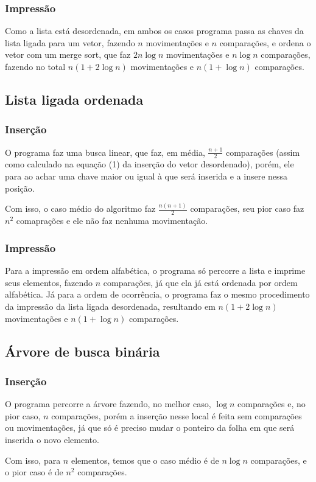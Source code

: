 \documentclass[12pt, a4paper]{article} %
\begin{document}
		\subsubsection{Impressão}
		\par Como a lista está desordenada, em ambos os casos programa passa as chaves da lista ligada para um vetor, fazendo $n$ movimentações e $n$ comparações, e ordena o vetor com um merge sort, que faz $2n\log n$ movimentações e $n\log n$ comparações, fazendo no total $n(1+2\log n)$ movimentações e $n(1+\log n)$ comparações.

	\subsection{Lista ligada ordenada}
		\subsubsection{Inserção}
		\par O programa faz uma busca linear, que faz, em média, $\frac{n+1}{2}$ comparações (assim como calculado na equação (1) da inserção do vetor desordenado), porém, ele para ao achar uma chave maior ou igual à que será inserida e a insere nessa posição.
		\par Com isso, o caso médio do algoritmo faz $\frac{n(n+1)}{2}$ comparações, seu pior caso faz $n^2$ comaprações e ele não faz nenhuma movimentação.
		\subsubsection{Impressão}
		\par Para a impressão em ordem alfabética, o programa só percorre a lista e imprime seus elementos, fazendo $n$ comparações, já que ela já está ordenada por ordem alfabética. Já para a ordem de ocorrência, o programa faz o mesmo procedimento da impressão da lista ligada desordenada, resultando em $n(1+2\log n)$ movimentações e $n(1+\log n)$ comparações.

	\subsection{Árvore de busca binária}
		\subsubsection{Inserção}
		\par O programa percorre a árvore fazendo, no melhor caso, $\log n$ comparações e, no pior caso, $n$ comparações, porém a inserção nesse local é feita sem comparações ou movimentações, já que só é preciso mudar o ponteiro da folha em que será inserida o novo elemento.
		\par Com isso, para $n$ elementos, temos que o caso médio é de $n\log n$ comparações, e o pior caso é de $n^2$ comparações.
\end{document}
